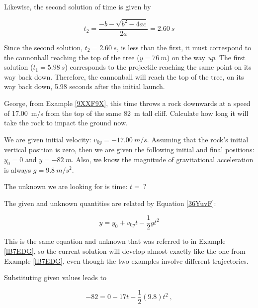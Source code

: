\documentclass[main-physics.tex]{subfiles}
\begin{document}
Likewise, the second solution of time is given by

\begin{equation*}
    t_2 = \frac{-b - \sqrt{b^2 - 4ac}}{2a} = \SI{2.60}{s}
\end{equation*}

Since the second solution, $t_2 = \SI{2.60}{s}$, is less than the first, it must correspond to the cannonball reaching the top of the tree ($y=\SI{76}{m}$) on the way \textit{up}. The first solution ($t_1 = \SI{5.98}{s}$) corresponds to the projectile reaching the same point on its way back down. Therefore, the cannonball will reach the top of the tree, on its way back down, 5.98 seconds after the initial launch.

\endsolution


\begin{example} \label{pyn6Go}
    George, from Example \ref{9XXF9X}, this time throws a rock downwards at a speed of \SI{17.00}{m/s} from the top of the same \SI{82}{m} tall cliff. Calculate how long it will take the rock to impact the ground now.
\end{example}

\Solution We are given initial velocity: $v_{0y} = \SI{-17.00}{m/s}$. Assuming that the rock's initial vertical position is zero, then we are given the following initial and final positions: $y_0 = 0$ and $y = \SI{-82}{m}$. Also, we know the magnitude of gravitational acceleration is always $g = \SI{9.8}{m/s^2}$. 

\vspace{1em}

The unknown we are looking for is time: $t =\ ?$

\vspace{1em}

The given and unknown quantities are related by Equation \eqref{36YuvF}:

\begin{equation*}
    y = y_0 + v_{0y}t - \frac{1}{2}  g t^2
\end{equation*}

This is the same equation and unknown that was referred to in Example \ref{lB7EDG}, so the current solution will develop almost exactly like the one from Example \ref{lB7EDG}, even though the two examples involve different trajectories.


\vspace{1em}

Substituting given values leads to 

\begin{equation*}
    -82 =  0 - 17 t -\frac{1}{2}(9.8) t^2\ ,
\end{equation*}
\end{document}
